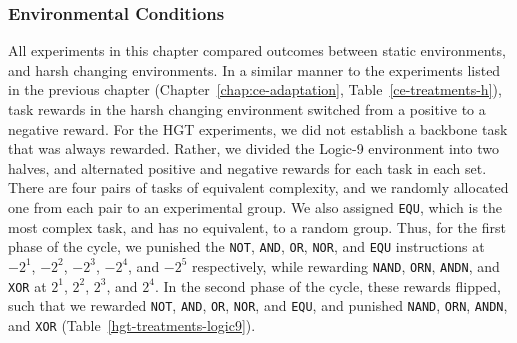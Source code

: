 \documentclass[PhD]{msu-thesis}
\begin{document}
\subsubsection{Environmental Conditions}
All experiments in this chapter compared outcomes between static environments, and harsh changing environments. In a similar manner to the experiments listed in the previous chapter (Chapter~\ref{chap:ce-adaptation}, Table~\ref{ce-treatments-h}), task rewards in the harsh changing environment switched from a positive to a negative reward. For the HGT experiments, we did not establish a backbone task that was always rewarded. Rather, we divided the Logic-9 environment into two halves, and alternated positive and negative rewards for each task in each set. There are four pairs of tasks of equivalent complexity, and we randomly allocated one from each pair to an experimental group. We also assigned \texttt{EQU}, which is the most complex task, and has no equivalent, to a random group. Thus, for the first phase of the cycle, we punished the \texttt{NOT}, \texttt{AND}, \texttt{OR}, \texttt{NOR}, and \texttt{EQU} instructions at $-2^1$, $-2^2$, $-2^3$, $-2^4$, and $-2^5$ respectively, while rewarding \texttt{NAND}, \texttt{ORN}, \texttt{ANDN}, and \texttt{XOR} at $2^1$, $2^2$, $2^3$, and $2^4$. In the second phase of the cycle, these rewards flipped, such that we rewarded \texttt{NOT}, \texttt{AND}, \texttt{OR}, \texttt{NOR}, and \texttt{EQU}, and punished \texttt{NAND}, \texttt{ORN}, \texttt{ANDN}, and \texttt{XOR} (Table~\ref{hgt-treatments-logic9}).
\end{document}
